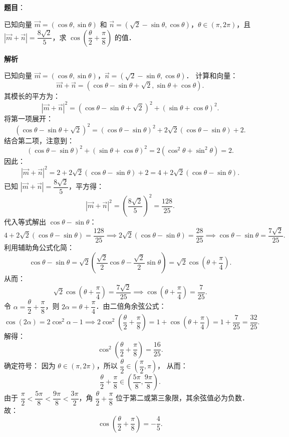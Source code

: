 \begin{answer}

\textbf{题目}：

已知向量 $\vec{m} = (\cos\theta, \sin\theta)$ 和 $\vec{n} = (\sqrt{2}-\sin\theta, \cos\theta)$，$\theta \in (\pi, 2\pi)$，且 $|\vec{m} + \vec{n}| = \dfrac{8\sqrt{2}}{5}$，求 $\cos\left(\dfrac{\theta}{2} + \dfrac{\pi}{8}\right)$ 的值．

\textbf{解析}

已知向量 $\vec{m} = (\cos\theta, \sin\theta)$，$\vec{n} = (\sqrt{2}-\sin\theta, \cos\theta)$．
计算和向量：
\nopagebreak[4]
\[
\vec{m} + \vec{n} = (\cos\theta - \sin\theta + \sqrt{2}, \sin\theta + \cos\theta).
\]
其模长的平方为：
\nopagebreak[4]
\[
|\vec{m} + \vec{n}|^2 = (\cos\theta - \sin\theta + \sqrt{2})^2 + (\sin\theta + \cos\theta)^2.
\]
将第一项展开：
\nopagebreak[4]
\[
(\cos\theta - \sin\theta + \sqrt{2})^2 = (\cos\theta - \sin\theta)^2 + 2\sqrt{2}(\cos\theta - \sin\theta) + 2.
\]
结合第二项，注意到：
\nopagebreak[4]
\[
(\cos\theta - \sin\theta)^2 + (\sin\theta + \cos\theta)^2 = 2(\cos^2\theta + \sin^2\theta) = 2.
\]
因此：
\nopagebreak[4]
\[
|\vec{m} + \vec{n}|^2 = 2 + 2\sqrt{2}(\cos\theta - \sin\theta) + 2 = 4 + 2\sqrt{2}(\cos\theta - \sin\theta).
\]
已知 $|\vec{m} + \vec{n}| = \dfrac{8\sqrt{2}}{5}$，平方得：
\nopagebreak[4]
\[
|\vec{m} + \vec{n}|^2 = \left(\dfrac{8\sqrt{2}}{5}\right)^2 = \dfrac{128}{25}.
\]
代入等式解出 $\cos\theta - \sin\theta$：
\nopagebreak[4]
\[
4 + 2\sqrt{2}(\cos\theta - \sin\theta) = \dfrac{128}{25} \implies 2\sqrt{2}(\cos\theta - \sin\theta) = \dfrac{28}{25} \implies \cos\theta - \sin\theta = \dfrac{7\sqrt{2}}{25}.
\]
利用辅助角公式化简：
\nopagebreak[4]
\[
\cos\theta - \sin\theta = \sqrt{2}\left(\dfrac{\sqrt{2}}{2}\cos\theta - \dfrac{\sqrt{2}}{2}\sin\theta\right) = \sqrt{2}\cos\left(\theta + \dfrac{\pi}{4}\right).
\]
从而：
\nopagebreak[4]
\[
\sqrt{2}\cos\left(\theta + \dfrac{\pi}{4}\right) = \dfrac{7\sqrt{2}}{25} \implies \cos\left(\theta + \dfrac{\pi}{4}\right) = \dfrac{7}{25}.
\]
令 $\alpha = \dfrac{\theta}{2} + \dfrac{\pi}{8}$，则 $2\alpha = \theta + \dfrac{\pi}{4}$．由二倍角余弦公式：
\nopagebreak[4]
\[
\cos(2\alpha) = 2\cos^2\alpha - 1 \implies 2\cos^2\left(\dfrac{\theta}{2} + \dfrac{\pi}{8}\right) = 1 + \cos\left(\theta + \dfrac{\pi}{4}\right) = 1 + \dfrac{7}{25} = \dfrac{32}{25}.
\]
解得：
\nopagebreak[4]
\[
\cos^2\left(\dfrac{\theta}{2} + \dfrac{\pi}{8}\right) = \dfrac{16}{25}.
\]
确定符号：
因为 $\theta \in (\pi, 2\pi)$，所以 $\dfrac{\theta}{2} \in \left(\dfrac{\pi}{2}, \pi\right)$，
从而：
\nopagebreak[4]
\[
\dfrac{\theta}{2} + \dfrac{\pi}{8} \in \left(\dfrac{5\pi}{8}, \dfrac{9\pi}{8}\right).
\]
由于 $\dfrac{\pi}{2} < \dfrac{5\pi}{8} < \dfrac{9\pi}{8} < \dfrac{3\pi}{2}$，角 $\dfrac{\theta}{2} + \dfrac{\pi}{8}$ 位于第二或第三象限，其余弦值必为负数．
故：
\nopagebreak[4]
\[
\cos\left(\dfrac{\theta}{2} + \dfrac{\pi}{8}\right) = -\dfrac{4}{5}.
\]


\end{answer}
